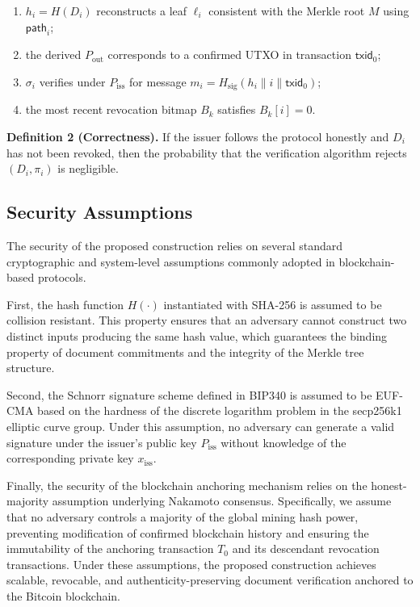 \documentclass[preprint,12pt]{elsarticle}
\begin{document}
\begin{enumerate}
    \item $h_i = H(D_i)$ reconstructs a leaf $\ell_i$ consistent with the Merkle root $M$ using $\mathsf{path}_i$;
    \item the derived $P_{\mathrm{out}}$ corresponds to a confirmed UTXO in transaction $\mathsf{txid}_0$;
    \item $\sigma_i$ verifies under $P_{\mathrm{iss}}$ for message 
    $m_i = H_{\mathrm{sig}}(h_i \parallel i \parallel \mathsf{txid}_0)$;
    \item the most recent revocation bitmap $B_k$ satisfies $B_k[i] = 0$.
\end{enumerate}


\textbf{Definition 2 (Correctness).}  
If the issuer follows the protocol honestly and $D_i$ has not been revoked, then the probability that the verification algorithm rejects $(D_i, \pi_i)$ is negligible.

\subsection{Security Assumptions}

The security of the proposed construction relies on several standard cryptographic and system-level assumptions commonly adopted in blockchain-based protocols.

First, the hash function $H(\cdot)$ instantiated with SHA-256 is assumed to be collision resistant. This property ensures that an adversary cannot construct two distinct inputs producing the same hash value, which guarantees the binding property of document commitments and the integrity of the Merkle tree structure.

Second, the Schnorr signature scheme defined in BIP340 is assumed to be EUF-CMA based on the hardness of the discrete logarithm problem in the secp256k1 elliptic curve group. Under this assumption, no adversary can generate a valid signature under the issuer's public key $P_{\mathrm{iss}}$ without knowledge of the corresponding private key $x_{\mathrm{iss}}$.

Finally, the security of the blockchain anchoring mechanism relies on the honest-majority assumption underlying Nakamoto consensus. Specifically, we assume that no adversary controls a majority of the global mining hash power, preventing modification of confirmed blockchain history and ensuring the immutability of the anchoring transaction $T_0$ and its descendant revocation transactions.
Under these assumptions, the proposed construction achieves scalable, revocable, and authenticity-preserving document verification anchored to the Bitcoin blockchain.
\end{document}
